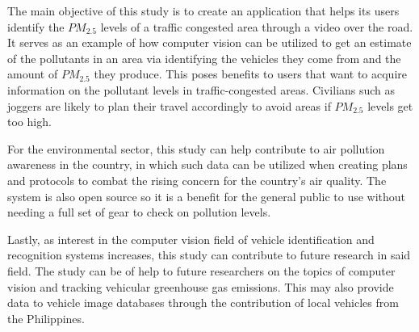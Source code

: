 The main objective of this study is to create an application that helps its users identify the $PM_{2.5}$ levels of a traffic congested area through a video over the road. It serves as an example of how computer vision can be utilized to get an estimate of the pollutants in an area via identifying the vehicles they come from and the amount of $PM_{2.5}$ they produce. This poses benefits to users that want to acquire information on the pollutant levels in traffic-congested areas. Civilians such as joggers are likely to plan their travel accordingly to avoid areas if $PM_{2.5}$ levels get too high.

For the environmental sector, this study can help contribute to air pollution awareness in the country, in which such data can be utilized when creating plans and protocols to combat the rising concern for the country’s air quality. The system is also open source so it is a benefit for the general public to use without needing a full set of gear to check on pollution levels.

Lastly, as interest in the computer vision field of vehicle identification and recognition systems increases, this study can contribute to future research in said field. The study can be of help to future researchers on the topics of computer vision and tracking vehicular greenhouse gas emissions. This may also provide data to vehicle image databases through the contribution of local vehicles from the Philippines.




\begin{comment}
If applicable, describe possible commercialization and/or innovation in your research.
\end{comment}


